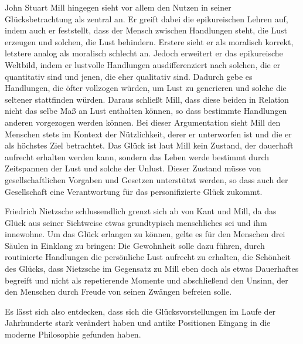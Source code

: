 John Stuart Mill hingegen sieht vor allem den Nutzen in seiner Glücksbetrachtung als zentral an. 
Er greift dabei die epikureischen Lehren auf, indem auch er feststellt, dass der Mensch zwischen Handlungen steht, die Lust erzeugen und solchen, die Lust behindern. 
Erstere sieht er als moralisch korrekt, letztere analog als moralisch schlecht an. 
Jedoch erweitert er das epikureische Weltbild, indem er lustvolle Handlungen ausdifferenziert nach solchen, die er quantitativ sind und jenen, die eher qualitativ sind. 
Dadurch gebe es Handlungen, die öfter vollzogen würden, um Lust zu generieren und solche die seltener stattfinden würden. 
Daraus schließt Mill, dass diese beiden in Relation nicht das selbe Maß an Lust enthalten können, so dass bestimmte Handlungen anderen vorgezogen werden können. 
Bei dieser Argumentation sieht Mill den Menschen stets im Kontext der Nützlichkeit, derer er unterworfen ist und die er als höchstes Ziel betrachtet. 
Das Glück ist laut Mill kein Zustand, der dauerhaft aufrecht erhalten werden kann, sondern das Leben werde bestimmt durch Zeitspannen der Lust und solche der Unlust. 
Dieser Zustand müsse von gesellschaftlichen Vorgaben und Gesetzen unterstützt werden, so dass auch der Gesellschaft eine Verantwortung für das personifizierte Glück zukommt.

Friedrich Nietzsche schlussendlich grenzt sich ab von Kant und Mill, da das Glück aus seiner Sichtweise etwas grundtypisch menschliches sei und ihm innewohne. 
Um das Glück erlangen zu können, gelte es für den Menschen drei Säulen in Einklang zu bringen: 
Die Gewohnheit solle dazu führen, durch routinierte Handlungen die persönliche Lust aufrecht zu erhalten, die Schönheit des Glücks, dass Nietzsche im Gegensatz zu Mill eben doch als etwas Dauerhaftes begreift und nicht als repetierende Momente und abschließend den Unsinn, der den Menschen durch Freude von seinen Zwängen befreien solle.

Es lässt sich also entdecken, dass sich die Glücksvorstellungen im Laufe der Jahrhunderte stark verändert haben und antike Positionen Eingang in die moderne Philosophie gefunden haben.